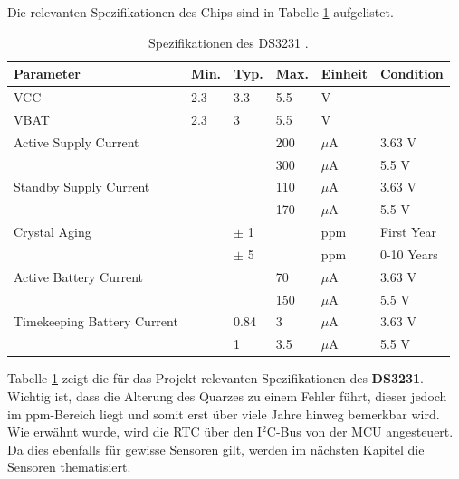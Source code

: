 \newpage
Die relevanten Spezifikationen des Chips sind in Tabelle \ref{tab:DS3231} aufgelistet.\\

\begin{table}[h]
\begin{tabular}{llllll}
\hline 
\textbf{Parameter} & \textbf{Min.} & \textbf{Typ.} & \textbf{Max.} & \textbf{Einheit} & \textbf{Condition} \\ 
\hline 
VCC & 2.3 & 3.3 & 5.5 & V &  \\ 
VBAT & 2.3 & 3 & 5.5 & V &  \\ 
Active Supply Current &  &  & 200 & $\mu$A & 3.63 V \\ 
 &  &  & 300 & $\mu$A & 5.5 V \\ 
Standby Supply Current &  & & 110 & $\mu$A & 3.63 V \\ 
 &  &  & 170 & $\mu$A & 5.5 V \\ 
Crystal Aging &  & $\pm$ 1 &  & ppm & First Year \\ 
 &  & $\pm$ 5 &  & ppm & 0-10 Years \\ 
Active Battery Current &  &  & 70 & $\mu$A & 3.63 V \\ 
 &  &  & 150 & $\mu$A & 5.5 V \\ 
Timekeeping Battery Current &  & 0.84 & 3 & $\mu$A & 3.63 V \\ 
 &  & 1 & 3.5 & $\mu$A & 5.5 V \\ 
\hline 
\end{tabular} 
\caption{Spezifikationen des DS3231 \cite{DS3231DS}.}
\label{tab:DS3231}
\end{table}

Tabelle \ref{tab:DS3231} zeigt die für das Projekt relevanten Spezifikationen des \textbf{DS3231}. Wichtig ist, dass die Alterung des Quarzes zu einem Fehler führt, dieser jedoch im ppm-Bereich liegt und somit erst über viele Jahre hinweg bemerkbar wird.\\[0.5cm]
Wie erwähnt wurde, wird die RTC über den I$^2$C-Bus von der MCU angesteuert. Da dies ebenfalls für gewisse Sensoren gilt, werden im nächsten Kapitel die Sensoren thematisiert.

